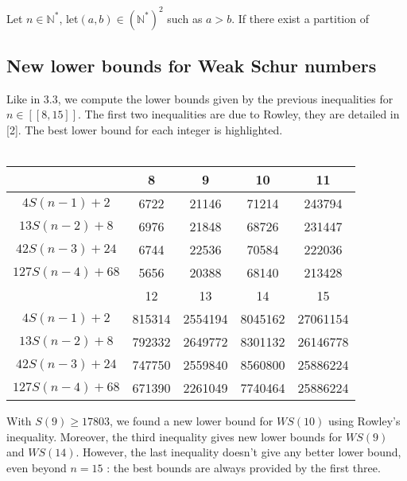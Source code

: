 \begin{Theorem}
Let \( n \in \mathbb{N}^*\), let\( (a,b) \in (\mathbb{N}^*)^2\) such as \(a>b\). If there exist a partition of  
\end{Theorem}

\subsection{New lower bounds for Weak Schur numbers}
Like in 3.3, we compute the lower bounds given by the previous inequalities for \( n \in [\![8,15]\!] \). The first two inequalities are due to Rowley, they are detailed in [2]. The best lower bound for each integer is highlighted.\\
\\
\begin{center}
\begin{tabular}{|*{5}{c|}}
    \hline
	 & 8 & 9 & 10 & 11 \\
	\hline
	\(4S(n-1) + 2 \) & 6722 & 21146 & \cellcolor{yellow} 71214 & \cellcolor{yellow} 243794\\
	\hline
	\(13S(n-2) + 8 \) & \cellcolor{yellow} 6976 & 21848 & 68726 & 231447\\
	\hline
	\(42S(n-3) + 24 \) & 6744 & \cellcolor{yellow} 22536 & 70584 & 222036 \\
	\hline
	\(127S(n-4) + 68 \) & 5656 & 20388 & 68140 & 213428\\
	\hline
	\hline
	& 12 & 13 & 14 & 15 \\
	\hline
	\(4S(n-1) + 2 \) & \cellcolor{yellow} 815314 & 2554194 & 8045162 & \cellcolor{yellow} 27061154\\
	\hline
	\(13S(n-2) + 8 \) & 792332 & \cellcolor{yellow}2649772 & 8301132 & 26146778 \\
	\hline
	\(42S(n-3) + 24 \) & 747750 & 2559840 & \cellcolor{yellow} 8560800 &  25886224 \\
	\hline
	\(127S(n-4) + 68 \) & 671390 & 2261049 & 7740464 & 25886224 \\
	\hline
\end{tabular}
\end{center}
With \( S(9) \geqslant 17803 \), we found a new lower bound for
\(WS(10)\) using Rowley's inequality. Moreover, the third inequality
gives new lower bounds for \(WS(9)\) and \(WS(14)\). However, the last
inequality doesn't give any better lower bound, even beyond \( n = 15 \)
: the best bounds are always provided by the first three.
